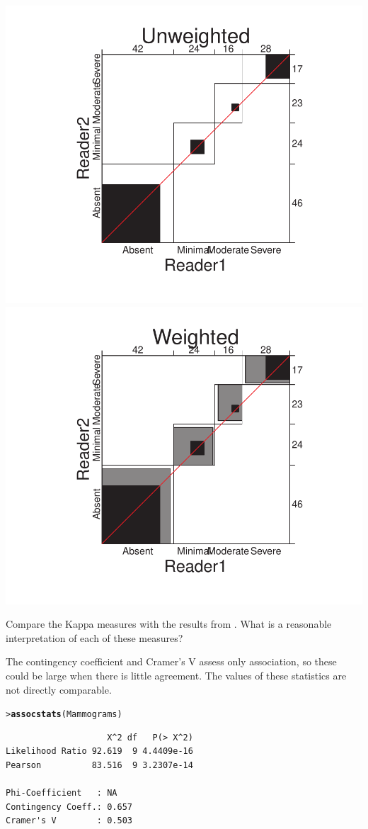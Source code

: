 \documentclass[10pt]{report}\usepackage[]{graphicx}\usepackage[]{color}
\makeatletter
\newcommand{\hlstd}[1]{\textcolor[rgb]{0.345,0.345,0.345}{#1}}%
\newcommand{\hlkwd}[1]{\textcolor[rgb]{0.737,0.353,0.396}{\textbf{#1}}}%
\newenvironment{kframe}{%
 \def\at@end@of@kframe{}%
 \ifinner\ifhmode%
  \def\at@end@of@kframe{\end{minipage}}%
  \begin{minipage}{\columnwidth}%
 \fi\fi%
 \def\FrameCommand##1{\hskip\@totalleftmargin \hskip-\fboxsep
 \colorbox{shadecolor}{##1}\hskip-\fboxsep
     \hskip-\linewidth \hskip-\@totalleftmargin \hskip\columnwidth}%
 \MakeFramed {\advance\hsize-\width
   \@totalleftmargin\z@ \linewidth\hsize
   \@setminipage}}%
 {\par\unskip\endMakeFramed%
 \at@end@of@kframe}
\newenvironment{knitrout}{}{} %
\renewenvironment{knitrout}{\small\renewcommand{\baselinestretch}{.85}}{} %
\makeatother
\begin{document}
\begin{Exercises}
\begin{enumerate*}
\begin{ans}
\begin{knitrout}
\centerline{\includegraphics[width=.5\textwidth]{soln/fig/ex4_6b-1} 
\includegraphics[width=.5\textwidth]{soln/fig/ex4_6b-2} }



\end{knitrout}
      \end{ans}
      
      \item Compare the Kappa measures with the results from . 
      What is a reasonable interpretation of each of these measures?
      \begin{ans}
      The contingency coefficient and Cramer's V assess only association, so these could be large when
      there is little agreement. The values of these statistics are not directly comparable. 
\begin{knitrout}\footnotesize
{}\color{fgcolor}\begin{kframe}
\begin{alltt}
\hlstd{> }\hlkwd{assocstats}\hlstd{(Mammograms)}
\end{alltt}
\begin{verbatim}
                    X^2 df   P(> X^2)
Likelihood Ratio 92.619  9 4.4409e-16
Pearson          83.516  9 3.2307e-14

Phi-Coefficient   : NA 
Contingency Coeff.: 0.657 
Cramer's V        : 0.503 
\end{verbatim}
\end{kframe}
\end{knitrout}
      \end{ans}
      

\end{enumerate*}
\end{Exercises}
\end{document}
